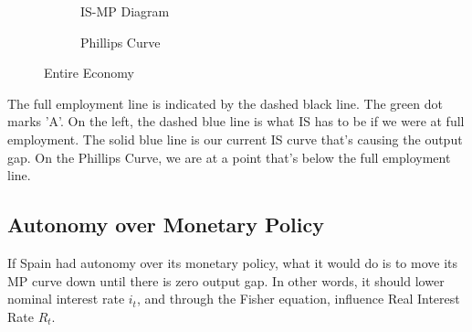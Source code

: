 \documentclass[11pt]{scrartcl}
\newcommand{\og}{\ensuremath{\tilde{Y}}}
\begin{document}
\begin{figure}[H]
\begin{subfigure}[b]{0.5\textwidth}
\centering
{}
\caption{\color{blue}IS-\color{black}MP Diagram}
\end{subfigure}
\hspace{2ex}
\begin{subfigure}[b]{0.5\textwidth}
\centering
{}
\caption{Phillips Curve}
\end{subfigure}
\caption{Entire Economy}
\end{figure}

The full employment line is indicated by the dashed black line. The green dot marks 'A'. On the left, the dashed blue line is what IS has to be if we were at full employment. The solid blue line is our current IS curve that's causing the output gap. On the Phillips Curve, we are at a point that's below the full employment line. 

\subsection{Autonomy over Monetary Policy}

If Spain had autonomy over its monetary policy, what it would do is to move its MP curve down until there is zero output gap. In other words, it should lower nominal interest rate $i_t$, and through the Fisher equation, influence Real Interest Rate $R_t$.
\end{document}
